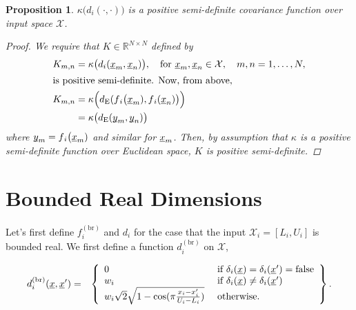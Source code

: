\documentclass[letterpaper]{article}
\newcommand{\vect}[1]{\underline{\smash{#1}}}
\renewcommand{\v}[1]{\vect{#1}}
\newcommand{\reals}{\mathds{R}}
\newcommand{\sX}{\mathcal{X}}
\newcommand{\br}{^{(\text{br})}}
\newtheorem{prop}[thm]{Proposition}
\begin{document}
\begin{prop}
  $\kappa\bigl(d{_i}(\cdot,\cdot)\bigr)$ is a positive semi-definite covariance function over input space $\sX$. 
\label{prop:cont_psd_proof}
\begin{proof}
We require that $K \in \reals^{N\times N}$ defined by
\begin{align*}
 K_{m, n} & = \kappa\bigl(d{_i}(\v{x}_m,\v{x}_n)\bigr)
,\quad \text{for }
\v{x}_m, \v{x}_n \in \sX,\quad m, n = 1, \ldots, N, 
\\
\intertext{is positive semi-definite. Now, from above,}
K_{m, n} & = \kappa\Bigl(d_{\text{E}}(f{_i}\bigl(\v{x}_m), f{_i}(\v{x}_n)\bigr)\Bigr) \\
& = \kappa\bigl(d_{\text{E}}(\v{y}_m, \v{y}_n)\bigr)
\end{align*}
where $\v{y}_m = f{_i}\bigl(\v{x}_m)$ and similar for $\v{x}_m$. Then, by assumption that $\kappa$ is a positive semi-definite function over Euclidean space, $K$ is positive semi-definite. 
\end{proof}
\end{prop}


\section{Bounded Real Dimensions}

Let's first define $f\br_i$ and $d_i$ for the case that the input $\sX_i=[L_i, U_i]$ is bounded real. We first define a function $d_i\br$ on $\sX$,

\begin{eqnarray}
\nonumber{}d_i\br(\v{x}, \v{x}') & = & \left\{\begin{array}{ll}
\nonumber{} 0 & \textrm{ if } \delta_i(\v{x}) = \delta_i(\v{x}') = \textrm{false}\\
\nonumber{} w_i & \textrm{ if } \delta_i(\v{x}) \neq \delta_i(\v{x}')\\
\nonumber{} w_i \sqrt{2} \sqrt{1 - \cos(\pi \frac{x_i-x_i'}{U_i-L_i})} & \textrm{ otherwise. }\end{array}\right\}.
\end{eqnarray}
\end{document}
